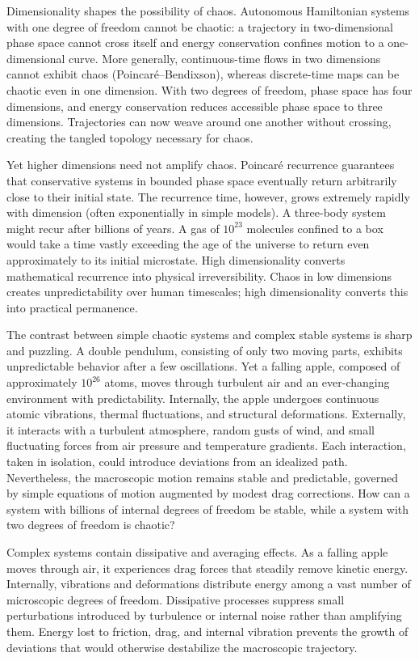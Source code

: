 Dimensionality shapes the possibility of chaos. Autonomous Hamiltonian systems with one degree of freedom cannot be chaotic: a trajectory in two-dimensional phase space cannot cross itself and energy conservation confines motion to a one-dimensional curve. More generally, continuous-time flows in two dimensions cannot exhibit chaos (Poincaré–Bendixson), whereas discrete-time maps can be chaotic even in one dimension. With two degrees of freedom, phase space has four dimensions, and energy conservation reduces accessible phase space to three dimensions. Trajectories can now weave around one another without crossing, creating the tangled topology necessary for chaos.

Yet higher dimensions need not amplify chaos. Poincaré recurrence guarantees that conservative systems in bounded phase space eventually return arbitrarily close to their initial state. The recurrence time, however, grows extremely rapidly with dimension (often exponentially in simple models). A three-body system might recur after billions of years. A gas of $10^{23}$ molecules confined to a box would take a time vastly exceeding the age of the universe to return even approximately to its initial microstate. High dimensionality converts mathematical recurrence into physical irreversibility. Chaos in low dimensions creates unpredictability over human timescales; high dimensionality converts this into practical permanence.

The contrast between simple chaotic systems and complex stable systems is sharp and puzzling. A double pendulum, consisting of only two moving parts, exhibits unpredictable behavior after a few oscillations. Yet a falling apple, composed of approximately $10^{26}$ atoms, moves through turbulent air and an ever-changing environment with predictability. Internally, the apple undergoes continuous atomic vibrations, thermal fluctuations, and structural deformations. Externally, it interacts with a turbulent atmosphere, random gusts of wind, and small fluctuating forces from air pressure and temperature gradients. Each interaction, taken in isolation, could introduce deviations from an idealized path. Nevertheless, the macroscopic motion remains stable and predictable, governed by simple equations of motion augmented by modest drag corrections. How can a system with billions of internal degrees of freedom be stable, while a system with two degrees of freedom is chaotic?

Complex systems contain dissipative and averaging effects. As a falling apple moves through air, it experiences drag forces that steadily remove kinetic energy. Internally, vibrations and deformations distribute energy among a vast number of microscopic degrees of freedom. Dissipative processes suppress small perturbations introduced by turbulence or internal noise rather than amplifying them. Energy lost to friction, drag, and internal vibration prevents the growth of deviations that would otherwise destabilize the macroscopic trajectory.

